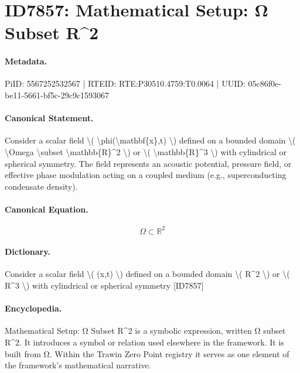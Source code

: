 \section*{ID7857: Mathematical Setup: Ω Subset R\textasciicircum{}2}
\paragraph{Metadata.}
PiID: 5567252532567 | RTEID: RTE:P30510.4759:T0.0064 | UUID: 05c86f0e-be11-5661-bf5c-29c9c1593067

\paragraph{Canonical Statement.}
Consider a scalar field \textbackslash{}( \textbackslash{}phi(\textbackslash{}mathbf\{x\},t) \textbackslash{}) defined on a bounded domain \textbackslash{}( \textbackslash{}Omega \textbackslash{}subset \textbackslash{}mathbb\{R\}\textasciicircum{}2 \textbackslash{}) or \textbackslash{}( \textbackslash{}mathbb\{R\}\textasciicircum{}3 \textbackslash{}) with cylindrical or spherical symmetry. The field represents an acoustic potential, pressure field, or effective phase modulation acting on a coupled medium (e.g., superconducting condensate density).

\paragraph{Canonical Equation.}
\[
\Omega \subset \mathbb{R}^2
\]

\paragraph{Dictionary.}
Consider a scalar field \textbackslash{}( (x,t) \textbackslash{}) defined on a bounded domain \textbackslash{}( R\textasciicircum{}2 \textbackslash{}) or \textbackslash{}( R\textasciicircum{}3 \textbackslash{}) with cylindrical or spherical symmetry [ID7857]

\paragraph{Encyclopedia.}
Mathematical Setup: Ω Subset R\textasciicircum{}2 is a symbolic expression, written Ω subset R\textasciicircum{}2. It introduces a symbol or relation used elsewhere in the framework. It is built from Ω. Within the Trawin Zero Point registry it serves as one element of the framework's mathematical narrative.
